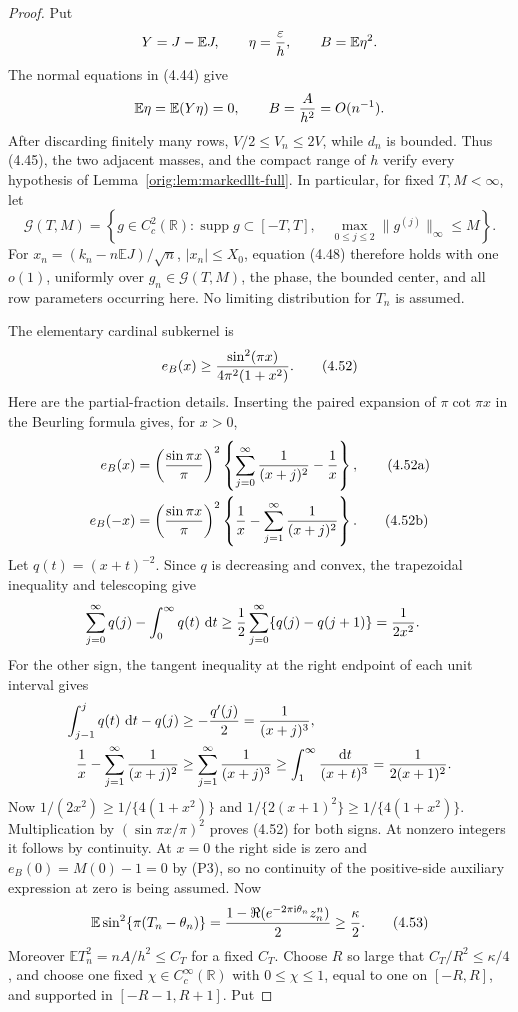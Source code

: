 \documentclass[11pt,a4paper]{article}
\numberwithin{equation}{section}
\theoremstyle{definition}
\theoremstyle{remark}
\newcommand{\E}{\mathbb E}
\newcommand{\ii}{\mathrm i}
\newcommand{\dd}{\,\mathrm d}
\begin{document}
\begin{proof}
Put
\[
 Y=J-\E J,\qquad \eta={\varepsilon\over h},\qquad
 B=\E\eta^2.
\]
The normal equations in (4.44) give
\[
 \E\eta=\E(Y\eta)=0,\qquad
 B={A\over h^2}=O(n^{-1}).
\]
After discarding finitely many rows, \(V/2\le V_n\le2V\), while
\(d_n\) is bounded.  Thus (4.45), the two adjacent masses, and the compact
range of \(h\) verify every hypothesis of
Lemma~\ref{orig:lem:markedllt-full}.  In particular, for fixed \(T,M<\infty\),
let
\[
 \mathscr G(T,M)=\left\{g\in C_c^2(\mathbb R):
 \operatorname {supp}g\subset[-T,T],\quad
 \max_{0\le j\le2}\|g^{(j)}\|_\infty\le M\right\}.     \tag{4.47b}
\]
For \(x_n=(k_n-n\E J)/\sqrt n\), \(|x_n|\le X_0\), equation (4.48)
therefore holds with one \(o(1)\), uniformly over
\(g_n\in\mathscr G(T,M)\), the phase, the bounded center, and all row
parameters occurring here.  No limiting distribution for \(T_n\) is
assumed.

The elementary cardinal subkernel is
\[
 e_B(x)\ge {\sin^2(\pi x)\over4\pi^2(1+x^2)}.         \tag{4.52}
\]
Here are the partial-fraction details.  Inserting the paired expansion of
$\pi\cot\pi x$ in the Beurling formula gives, for $x>0$,
\begin{align}
 e_B(x)&=\left({\sin\pi x\over\pi}\right)^2
 \left\{\sum_{j=0}^\infty{1\over(x+j)^2}-{1\over x}\right\},
                                                               \tag{4.52a}\\
 e_B(-x)&=\left({\sin\pi x\over\pi}\right)^2
 \left\{{1\over x}-\sum_{j=1}^\infty{1\over(x+j)^2}\right\}.
                                                               \tag{4.52b}
\end{align}
Let $q(t)=(x+t)^{-2}$.  Since $q$ is decreasing and convex, the
trapezoidal inequality and telescoping give
\begin{align*}
 \sum_{j=0}^\infty q(j)-\int_0^\infty q(t)\,\dd t
 &\ge {1\over2}\sum_{j=0}^\infty\{q(j)-q(j+1)\}
 ={1\over2x^2}.
\end{align*}
For the other sign, the tangent inequality at the right endpoint of each
unit interval gives
\begin{align*}
 \int_{j-1}^{j}q(t)\,\dd t-q(j)&\ge-{q'(j)\over2}
 ={1\over(x+j)^3},\\
 {1\over x}-\sum_{j=1}^\infty{1\over(x+j)^2}
 &\ge\sum_{j=1}^\infty{1\over(x+j)^3}
 \ge\int_1^\infty{\dd t\over(x+t)^3}
 ={1\over2(x+1)^2}.
\end{align*}
Now $1/(2x^2)\ge1/\{4(1+x^2)\}$ and
$1/\{2(x+1)^2\}\ge1/\{4(1+x^2)\}$.  Multiplication by
$(\sin\pi x/\pi)^2$ proves (4.52) for both signs.  At nonzero integers it
follows by continuity.  At $x=0$ the right side is zero and
$e_B(0)=M(0)-1=0$ by (P3), so no continuity of
the positive-side auxiliary expression at zero is being assumed.  Now
\[
 \E\sin^2\{\pi(T_n-\theta_n)\}
 ={1-\Re(e^{-2\pi\ii\theta_n}z_n^n)\over2}
 \ge {\kappa\over2}.                                  \tag{4.53}
\]
Moreover $\E T_n^2=nA/h^2\le C_T$ for a fixed $C_T$.  Choose \(R\) so
large that \(C_T/R^2\le\kappa/4\), and choose one fixed
\(\chi\in C_c^\infty(\mathbb R)\) with \(0\le\chi\le1\), equal to one on
\([-R,R]\), and supported in \([-R-1,R+1]\).  Put


\end{proof}
\end{document}

